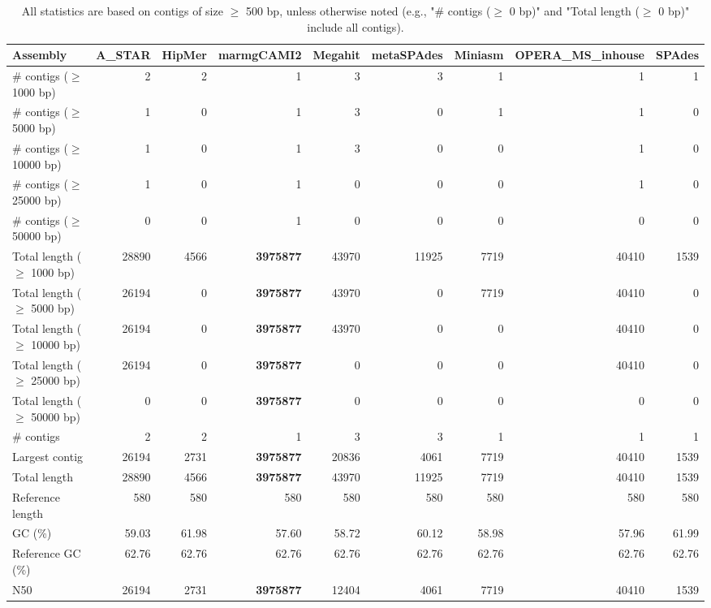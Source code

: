 \documentclass[12pt,a4paper]{article}
\begin{document}
\begin{table}[ht]
\begin{center}
\caption{All statistics are based on contigs of size $\geq$ 500 bp, unless otherwise noted (e.g., "\# contigs ($\geq$ 0 bp)" and "Total length ($\geq$ 0 bp)" include all contigs).}
\begin{tabular}{|l*{8}{|r}|}
\hline
Assembly & A\_STAR & HipMer & marmgCAMI2 & Megahit & metaSPAdes & Miniasm & OPERA\_MS\_inhouse & SPAdes \\ \hline
\# contigs ($\geq$ 1000 bp) & 2 & 2 & 1 & 3 & 3 & 1 & 1 & 1 \\ \hline
\# contigs ($\geq$ 5000 bp) & 1 & 0 & 1 & 3 & 0 & 1 & 1 & 0 \\ \hline
\# contigs ($\geq$ 10000 bp) & 1 & 0 & 1 & 3 & 0 & 0 & 1 & 0 \\ \hline
\# contigs ($\geq$ 25000 bp) & 1 & 0 & 1 & 0 & 0 & 0 & 1 & 0 \\ \hline
\# contigs ($\geq$ 50000 bp) & 0 & 0 & 1 & 0 & 0 & 0 & 0 & 0 \\ \hline
Total length ($\geq$ 1000 bp) & 28890 & 4566 & {\bf 3975877} & 43970 & 11925 & 7719 & 40410 & 1539 \\ \hline
Total length ($\geq$ 5000 bp) & 26194 & 0 & {\bf 3975877} & 43970 & 0 & 7719 & 40410 & 0 \\ \hline
Total length ($\geq$ 10000 bp) & 26194 & 0 & {\bf 3975877} & 43970 & 0 & 0 & 40410 & 0 \\ \hline
Total length ($\geq$ 25000 bp) & 26194 & 0 & {\bf 3975877} & 0 & 0 & 0 & 40410 & 0 \\ \hline
Total length ($\geq$ 50000 bp) & 0 & 0 & {\bf 3975877} & 0 & 0 & 0 & 0 & 0 \\ \hline
\# contigs & 2 & 2 & 1 & 3 & 3 & 1 & 1 & 1 \\ \hline
Largest contig & 26194 & 2731 & {\bf 3975877} & 20836 & 4061 & 7719 & 40410 & 1539 \\ \hline
Total length & 28890 & 4566 & {\bf 3975877} & 43970 & 11925 & 7719 & 40410 & 1539 \\ \hline
Reference length & 580 & 580 & 580 & 580 & 580 & 580 & 580 & 580 \\ \hline
GC (\%) & 59.03 & 61.98 & 57.60 & 58.72 & 60.12 & 58.98 & 57.96 & 61.99 \\ \hline
Reference GC (\%) & 62.76 & 62.76 & 62.76 & 62.76 & 62.76 & 62.76 & 62.76 & 62.76 \\ \hline
N50 & 26194 & 2731 & {\bf 3975877} & 12404 & 4061 & 7719 & 40410 & 1539 \\ \hline

\end{tabular}
\end{center}
\end{table}
\end{document}
